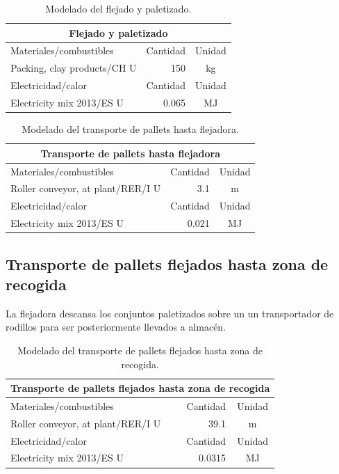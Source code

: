 \begin{table}[!htb]
\centering
\begin{tabular}{p{8cm}rc}
\toprule
\multicolumn{3}{c}{Flejado y paletizado}\\
\midrule
Materiales/combustibles & Cantidad & Unidad\\
\midrule
Packing, clay products/CH U & 150 & \si{kg}\\
\midrule
Electricidad/calor & Cantidad & Unidad\\
\midrule
Electricity mix 2013/ES U & 0.065 & \si{MJ}\\
\bottomrule
\end{tabular}
\caption{Modelado del flejado y paletizado.}
\label{modeladodelflejadoypaletizado}
\end{table}

\begin{table}[!htb]
\centering
\begin{tabular}{p{8cm}rc}
\toprule
\multicolumn{3}{c}{Transporte de pallets hasta flejadora}\\
\midrule
Materiales/combustibles & Cantidad & Unidad\\
\midrule
Roller conveyor, at plant/RER/I U & 3.1 & \si{m}\\
\midrule
Electricidad/calor & Cantidad & Unidad\\
\midrule
Electricity mix 2013/ES U & 0.021 & \si{MJ}\\
\bottomrule
\end{tabular}
\caption{Modelado del transporte de pallets hasta flejadora.}
\label{modeladopalletsflejadora}
\end{table}

\subsection{Transporte de pallets flejados hasta zona de recogida}

La flejadora descansa los conjuntos paletizados sobre un un transportador de rodillos para ser posteriormente llevados a almacén.

\begin{table}[!htb]
\centering
\begin{tabular}{p{8cm}rc}
\toprule
\multicolumn{3}{c}{Transporte de pallets flejados hasta zona de recogida}\\
\midrule
Materiales/combustibles & Cantidad & Unidad\\
\midrule
Roller conveyor, at plant/RER/I U & 39.1 & \si{m}\\
\midrule
Electricidad/calor & Cantidad & Unidad\\
\midrule
Electricity mix 2013/ES U & 0.0315 & \si{MJ}\\
\bottomrule
\end{tabular}
\caption{Modelado del transporte de pallets flejados hasta zona de recogida.}
\label{modeladopalletsrecogida}
\end{table}


